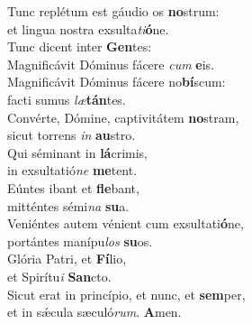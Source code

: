 \evenverse Tunc replétum est gáudio os \textbf{no}strum:~\*\\
\evenverse et lingua nostra exsulta\textit{ti}\textbf{ó}ne.\\
\oddverse Tunc dicent inter \textbf{Gen}tes:~\*\\
\oddverse Magnificávit Dóminus fácere \textit{cum} \textbf{e}is.\\
\evenverse Magnificávit Dóminus fácere no\textbf{bí}scum:~\*\\
\evenverse facti sumus \textit{læ}\textbf{tán}tes.\\
\oddverse Convérte, Dómine, captivitátem \textbf{no}stram,~\*\\
\oddverse sicut torrens \textit{in} \textbf{au}stro.\\
\evenverse Qui séminant in \textbf{lá}crimis,~\*\\
\evenverse in exsultatió\textit{ne} \textbf{me}tent.\\
\oddverse Eúntes ibant et \textbf{fle}bant,~\*\\
\oddverse mitténtes sémi\textit{na} \textbf{su}a.\\
\evenverse Veniéntes autem vénient cum exsultati\textbf{ó}ne,~\*\\
\evenverse portántes manípu\textit{los} \textbf{su}os.\\
\oddverse Glória Patri, et \textbf{Fí}lio,~\*\\
\oddverse et Spirítu\textit{i} \textbf{San}cto.\\
\evenverse Sicut erat in princípio, et nunc, et \textbf{sem}per,~\*\\
\evenverse et in sǽcula sæculó\textit{rum}. \textbf{A}men.\\
